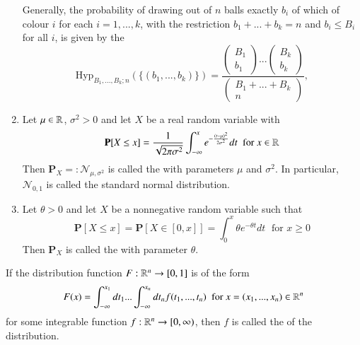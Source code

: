 \documentclass[12pt, a4paper, oneside, openright, titlepage]{book}
\begin{document}
\begin{eg}
\begin{enumerate}[label=\roman*]
\begin{equation*}
        \end{equation*}
            Generally, the probability of drawing out of $n$ balls exactly $b_i$ of which of colour $i$ for each $i = 1,...,k$, with the restriction $b_1+...+b_k = n$ and $b_i \leq B_i$ for all $i$, is given by the  \begin{equation*}
                \text{Hyp}_{B_1,...,B_k;n}(\{(b_1,...,b_k)\}) = \frac{\begin{pmatrix} B_1 \\ b_1\end{pmatrix}...\begin{pmatrix} B_k\\ b_k\end{pmatrix}}{\begin{pmatrix} B_1+...+B_k \\ n\end{pmatrix}},
            \end{equation*}
        \item Let $\mu \in \mathbb R$, $\sigma^2 > 0$ and let $X$ be a real random variable with \begin{equation*}
                \mathbf{P}[X\leq x] = \frac{1}{\sqrt{2\pi\sigma^2}}\int_{-\infty}^xe^{-\frac{(t-\mu)^2}{2\sigma^2}}dt\;\text{ for } x \in \mathbb R
        \end{equation*}
            Then $\mathbf{P}_X =: \mathcal{N}_{\mu,\sigma^2}$ is called the  with parameters $\mu$ and $\sigma^2$. In particular, $\mathcal{N}_{0,1}$ is called the standard normal distribution.
        \item Let $\theta > 0$ and let $X $ be a nonnegative random variable such that \begin{equation*}
                \mathbf{P}[X\leq x] = \mathbf{P}[X \in [0,x]] = \int_0^x\theta e^{-\theta t}dt\;\text{ for } x \geq 0
        \end{equation*}
            Then $\mathbf{P}_X$ is called the  with parameter $\theta$.
    \end{enumerate}
\end{eg}

\begin{defn}
    If the distribution function $F:\mathbb R^n\rightarrow [0,1]$ is of the form \begin{equation*}
        F(x) = \int_{-\infty}^{x_1}dt_1...\int_{-\infty}^{x_n}dt_nf(t_1,...,t_n) \;\text{ for } x = (x_1,...,x_n) \in \mathbb R^n
    \end{equation*}
    for some integrable function $f:\mathbb R^n\rightarrow [0,\infty)$, then $f$ is called the  of the distribution.
\end{defn}
\end{document}
